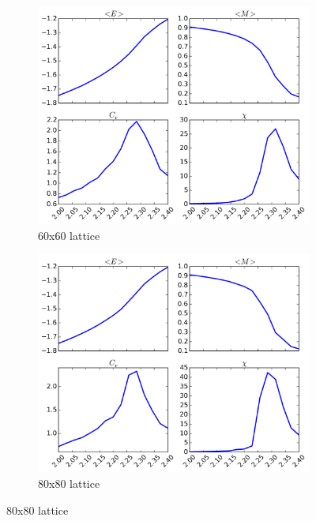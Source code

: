 \documentclass[11pt,a4paper,draft]{article}
\numberwithin{equation}{section}
\begin{document}
\begin{figure}
\begin{subfigure}{0.49\textwidth}
\includegraphics[width=\textwidth]{pics/e60.png}
\caption{60x60 lattice}
\label{fig:e60}
\end{subfigure}
%
\begin{subfigure}{0.49\textwidth}
\centering
\includegraphics[width=\textwidth]{pics/e80.png}
\caption{80x80 lattice}
\label{fig:e80}
\end{subfigure}


\end{figure}
\end{document}
